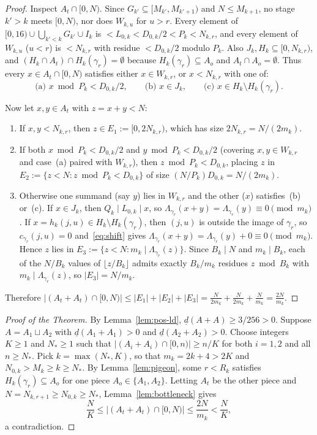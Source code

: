 \documentclass[11pt,a4paper]{amsart}
\theoremstyle{remark}
\newcommand{\ld}{\underline{d}}
\begin{document}
\begin{proof}
Inspect $A_t \cap [0, N)$. Since $G_{k'} \subseteq [M_{k'}, M_{k'+1})$ and $N \le M_{k+1}$, no stage $k' > k$ meets $[0, N)$, nor does $W_{k,u}$ for $u > r$. Every element of $[0, 16) \cup \bigcup_{k' < k} G_{k'} \cup I_k$ is $< L_{0,k} < D_{0,k} / 2 < P_k < N_{k,r}$, and every element of $W_{k,u}$ ($u < r$) is $< N_{k,r}$ with residue $< D_{0,k} / 2$ modulo $P_k$. Also $J_k, H_k \subseteq [0, N_{k,r})$, and $(H_k \cap A_t) \cap H_k(\gamma_r) = \emptyset$ because $H_k(\gamma_r) \subseteq A_o$ and $A_t \cap A_o = \emptyset$. Thus every $x \in A_t \cap [0, N)$ satisfies either $x \in W_{k,r}$, or $x < N_{k,r}$ with one of:
\[
\text{(a) } x \bmod P_k < D_{0,k}/2, \qquad \text{(b) } x \in J_k, \qquad \text{(c) } x \in H_k \setminus H_k(\gamma_r).
\]

Now let $x, y \in A_t$ with $z = x + y < N$:
\begin{enumerate}
\item If $x, y < N_{k,r}$, then $z \in E_1 := [0, 2 N_{k,r})$, which has size $2 N_{k,r} = N / (2 m_k)$.
\item If both $x \bmod P_k < D_{0,k} / 2$ and $y \bmod P_k < D_{0,k} / 2$ (covering $x, y \in W_{k,r}$ and case~(a) paired with $W_{k,r}$), then $z \bmod P_k < D_{0,k}$, placing $z$ in $E_2 := \{z < N : z \bmod P_k < D_{0,k}\}$ of size $(N / P_k) D_{0,k} = N / (2 m_k)$.
\item Otherwise one summand (say $y$) lies in $W_{k,r}$ and the other ($x$) satisfies~(b) or~(c). If $x \in J_k$, then $Q_k \mid L_{0,k} \mid x$, so $\Lambda_{\gamma_r}(x + y) = \Lambda_{\gamma_r}(y) \equiv 0 \pmod{m_k}$. If $x = h_k(j, u) \in H_k \setminus H_k(\gamma_r)$, then $(j, u)$ is outside the image of $\gamma_r$, so $c_{\gamma_r}(j, u) = 0$ and~\eqref{eq:shift} gives $\Lambda_{\gamma_r}(x + y) = \Lambda_{\gamma_r}(y) + 0 \equiv 0 \pmod{m_k}$. Hence $z$ lies in $E_3 := \{z < N : m_k \mid \Lambda_{\gamma_r}(z)\}$. Since $B_k \mid N$ and $m_k \mid B_k$, each of the $N / B_k$ values of $\lfloor z / B_k \rfloor$ admits exactly $B_k / m_k$ residues $z \bmod B_k$ with $m_k \mid \Lambda_{\gamma_r}(z)$, so $|E_3| = N / m_k$.
\end{enumerate}
Therefore $|(A_t + A_t) \cap [0, N)| \le |E_1| + |E_2| + |E_3| = \frac{N}{2 m_k} + \frac{N}{2 m_k} + \frac{N}{m_k} = \frac{2 N}{m_k}$.
\end{proof}

\begin{proof}[Proof of the Theorem]
By Lemma~\ref{lem:pos-ld}, $\ld(A + A) \ge 3 / 256 > 0$. Suppose $A = A_1 \sqcup A_2$ with $\ld(A_1 + A_1) > 0$ and $\ld(A_2 + A_2) > 0$. Choose integers $K \ge 1$ and $N_* \ge 1$ such that $|(A_i + A_i) \cap [0, n)| \ge n / K$ for both $i = 1, 2$ and all $n \ge N_*$. Pick $k = \max(N_*, K)$, so that $m_k = 2k + 4 > 2K$ and $N_{0,k} > M_k \ge k \ge N_*$. By Lemma~\ref{lem:pigeon}, some $r < R_k$ satisfies $H_k(\gamma_r) \subseteq A_o$ for one piece $A_o \in \{A_1, A_2\}$. Letting $A_t$ be the other piece and $N = N_{k,r+1} \ge N_{0,k} \ge N_*$, Lemma~\ref{lem:bottleneck} gives
\[
\frac{N}{K} \le |(A_t + A_t) \cap [0, N)| \le \frac{2 N}{m_k} < \frac{N}{K},
\]
a contradiction.
\end{proof}
\end{document}
